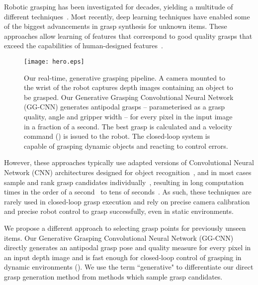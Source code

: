 \documentclass[conference]{IEEEtran}
\begin{document}
Robotic grasping has been investigated for decades, yielding a multitude of different techniques~\cite{bicchi2000robotic, bohg2014data, sahbani2012overview, shimoga1996robot}.  Most recently, deep learning techniques have enabled some of the biggest advancements in grasp synthesis for unknown items.  These approaches allow learning of features that correspond to good quality grasps that exceed the capabilities of human-designed features~\cite{Johns2016DeepUncertainty, Lenz2015DeepGrasps, Mahler2017Dex2,Pinto2016SupersizingHours}.  

\begin{figure}[tpb]
    \centering
    \texttt{[image: hero.eps]}
    \vspace{-5mm}
    \caption{Our real-time, generative grasping pipeline.  A camera mounted to the wrist of the robot captures depth images containing an object to be grasped. Our Generative Grasping Convolutional Neural Network (GG-CNN) generates antipodal grasps -- parameterised as a grasp quality, angle and gripper width -- for every pixel in the input image in a fraction of a second.  The best grasp is calculated and a velocity command () is issued to the robot. 
    The closed-loop system is capable of grasping dynamic objects and reacting to control errors.
    }
  \label{fig:hero} 
  \vspace{-6mm}
\end{figure}

However, these approaches typically use adapted versions of Convolutional Neural Network (CNN) architectures designed for object recognition~\cite{Johns2016DeepUncertainty,Kumra2017RoboticNetworks, Pinto2016SupersizingHours,Redmon2015Real-timeNetworks}, and in most cases sample and rank grasp candidates individually~\cite{Lenz2015DeepGrasps, Mahler2017Dex2, Pinto2016SupersizingHours}, resulting in long computation times in the order of a second~\cite{Mahler2017Dex2} to tens of seconds~\cite{Lenz2015DeepGrasps}.  As such, these techniques are rarely used in closed-loop grasp execution and rely on precise camera calibration and precise robot control to grasp successfully, even in static environments. 

We propose a different approach to selecting grasp points for previously unseen items.  Our Generative Grasping Convolutional Neural Network (GG-CNN) directly generates an antipodal grasp pose and quality measure for every pixel in an input depth image and is fast enough for closed-loop control of grasping in dynamic environments ().  We use the term ``generative" to differentiate our direct grasp generation method from methods which sample grasp candidates.
\end{document}
